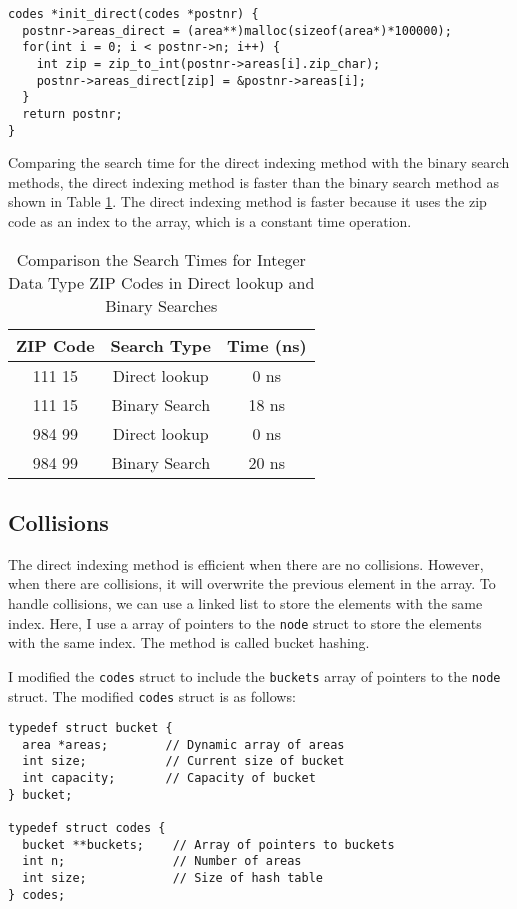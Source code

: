 \documentclass[a4paper,11pt]{article}
\begin{document}
\begin{verbatim}
codes *init_direct(codes *postnr) {
  postnr->areas_direct = (area**)malloc(sizeof(area*)*100000);
  for(int i = 0; i < postnr->n; i++) {
    int zip = zip_to_int(postnr->areas[i].zip_char);
    postnr->areas_direct[zip] = &postnr->areas[i];
  }
  return postnr;
}
\end{verbatim}

Comparing the search time for the direct indexing method with the binary search methods,
the direct indexing method is faster than the binary search method as shown in Table \ref{table:direct_times}.
The direct indexing method is faster because it uses the zip code as an index to the array, which is a constant time operation.

\begin{table}[h!]
  \centering
  \begin{tabular}{|c|c|c|}
    \hline
    \textbf{ZIP Code} & \textbf{Search Type} & \textbf{Time (ns)} \\ \hline
    111 15 & Direct lookup & 0 ns \\ \hline
    111 15 & Binary Search & 18 ns \\ \hline
    984 99 & Direct lookup & 0 ns \\ \hline
    984 99 & Binary Search & 20 ns \\ \hline
  \end{tabular}
  \caption{Comparison the Search Times for Integer Data Type ZIP Codes in Direct lookup and Binary Searches}
  \label{table:direct_times}
\end{table}

\subsection*{Collisions}

The direct indexing method is efficient when there are no collisions. However, when there are collisions,
it will overwrite the previous element in the array. To handle collisions, we can use a linked list to store the elements with the same index.
Here, I use a array of pointers to the {\tt node} struct to store the elements with the same index.
The method is called bucket hashing.

I modified the {\tt codes} struct to include the {\tt buckets} array 
of pointers to the {\tt node} struct. The modified {\tt codes} struct is as follows:

\begin{verbatim}
typedef struct bucket {
  area *areas;        // Dynamic array of areas
  int size;           // Current size of bucket
  int capacity;       // Capacity of bucket
} bucket;

typedef struct codes {
  bucket **buckets;    // Array of pointers to buckets
  int n;               // Number of areas
  int size;            // Size of hash table
} codes;
\end{verbatim}
\end{document}
